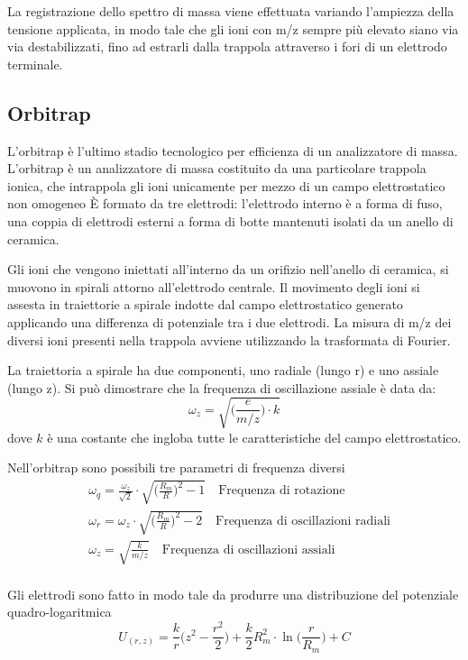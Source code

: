 La registrazione dello spettro di massa viene effettuata variando l'ampiezza della tensione applicata, in modo tale che gli ioni con m/z sempre più elevato siano via via destabilizzati, fino ad estrarli dalla trappola attraverso i fori di un elettrodo terminale.

\subsection{Orbitrap}
L'orbitrap è l'ultimo stadio tecnologico per efficienza di un analizzatore di massa.
L'orbitrap è un analizzatore di massa costituito da una particolare trappola ionica, che intrappola gli ioni unicamente per mezzo di un campo elettrostatico non omogeneo
È formato da tre elettrodi: l'elettrodo interno è a forma di fuso, una coppia di elettrodi esterni a forma di botte mantenuti isolati da un anello di ceramica.


Gli ioni che vengono iniettati all'interno da un orifizio nell'anello di ceramica, si muovono in spirali attorno all'elettrodo centrale.
Il movimento degli ioni si assesta in traiettorie a spirale indotte dal campo elettrostatico generato applicando una differenza di potenziale tra i due elettrodi.
La misura di m/z dei diversi ioni presenti nella trappola avviene utilizzando la trasformata di Fourier.

La traiettoria a spirale ha due componenti, uno radiale (lungo r) e uno assiale (lungo z). Si può dimostrare che la frequenza di oscillazione assiale è data da:
\[
\omega_z = \sqrt{\biggl(\frac{e}{m/z}\biggr) \cdot k}
\]
dove $k$ è una costante che ingloba tutte le caratteristiche del campo elettrostatico.

Nell'orbitrap sono possibili tre parametri di frequenza diversi
\begin{align*}
& \omega_q = \frac{\omega_z}{\sqrt{2}} \cdot \sqrt{\biggl(\frac{R_m}{R}\biggr)^2 - 1} \quad \text{Frequenza di rotazione}\\
& \omega_r = \omega_z \cdot \sqrt{\biggl(\frac{R_m}{R}\biggr)^2 - 2} \quad \text{Frequenza di oscillazioni radiali} \\
& \omega_z = \sqrt{\frac{k}{m/z}} \quad \text{Frequenza di oscillazioni assiali} \\
\end{align*}

Gli elettrodi sono fatto in modo tale da produrre una distribuzione del potenziale quadro-logaritmica
\[
U_{(r,z)} = \frac{k}{r} \biggl(z^2 - \frac{r^2}{2}\biggr) + \frac{k}{2} R_m^2 \cdot \ln \biggl(\frac{r}{R_m}\biggr) + C
\]

